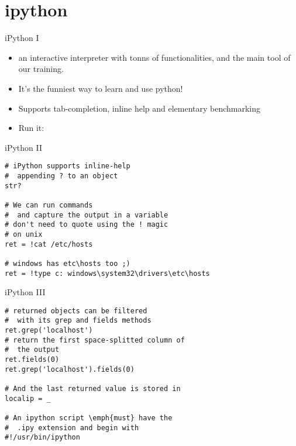 \section{ipython}



\begin{frame}{iPython I}
\begin{itemize}
\item an interactive interpreter with tonns of                                                                                                        functionalities, and the main tool of our training.                                                                                                      

\item   It's the funniest way to learn and use python!

\item   Supports tab-completion, inline help and elementary
    benchmarking

\item   Run it: \\
\end{itemize}

\end{frame}


\begin{frame}[fragile]{iPython II}
\begin{verbatim}
# iPython supports inline-help
#  appending ? to an object
str?

# We can run commands
#  and capture the output in a variable
# don't need to quote using the ! magic
# on unix
ret = !cat /etc/hosts

# windows has etc\hosts too ;)
ret = !type c: windows\system32\drivers\etc\hosts
\end{verbatim}
\end{frame}


\begin{frame}[fragile]{iPython III}
\begin{verbatim}
# returned objects can be filtered
#  with its grep and fields methods
ret.grep('localhost')
# return the first space-splitted column of
#  the output
ret.fields(0)
ret.grep('localhost').fields(0)

# And the last returned value is stored in 
localip = _

# An ipython script \emph{must} have the 
#  .ipy extension and begin with
#!/usr/bin/ipython 
\end{verbatim}
\end{frame}

